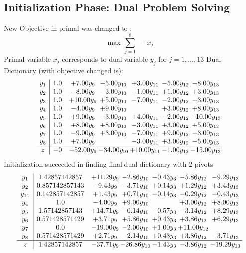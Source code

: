 \documentclass[9pt]{article}
\begin{document}
\subsection{Initialization Phase: Dual Problem Solving}
New Objective in primal was changed to : \[ \max\ \sum_{j=1}^{8}\ - x_j \] 
Primal variable $x_j$ corresponds to dual variable $y_j$ for $j = 1,\ldots,13$
Dual Dictionary (with objective changed is): 
\[\begin{array}{c| c c@{\hskip 2pt} c@{\hskip 2pt} c@{\hskip 2pt} c@{\hskip 2pt} c@{\hskip 2pt} }
 y_{1}   &  1.0 & +  7.00 y_{9} & -5.00 y_{10} & +  3.00 y_{11} & -5.00 y_{12} & -8.00 y_{13}\\
 y_{2}   &  1.0 & -8.00 y_{9} & -3.00 y_{10} & -1.00 y_{11} & +  1.00 y_{12} & +  3.00 y_{13}\\
 y_{3}   &  1.0 & + 10.00 y_{9} & +  5.00 y_{10} & -7.00 y_{11} & -2.00 y_{12} & -3.00 y_{13}\\
 y_{4}   &  1.0 & -4.00 y_{9} & +  9.00 y_{10} &   & +  3.00 y_{12} & +  8.00 y_{13}\\
 y_{5}   &  1.0 & +  9.00 y_{9} & -3.00 y_{10} & +  4.00 y_{11} & -2.00 y_{12} & + 10.00 y_{13}\\
 y_{6}   &  1.0 & +  8.00 y_{9} & +  8.00 y_{10} & -3.00 y_{11} & +  3.00 y_{12} & +  5.00 y_{13}\\
 y_{7}   &  1.0 & -9.00 y_{9} & +  3.00 y_{10} & -7.00 y_{11} & +  9.00 y_{12} & -3.00 y_{13}\\
 y_{8}   &  1.0 & +  7.00 y_{9} &   & -3.00 y_{11} & +  3.00 y_{12} & -5.00 y_{13}\\
\hline
z    &  -0 & -52.00 y_{9} & -34.00 y_{10} & + 10.00 y_{11} & -1.00 y_{12} & -15.00 y_{13}\\
\end{array}\]
Initialization succeeded in finding final dual dictionary with 2 pivots
\[\begin{array}{c| c c@{\hskip 2pt} c@{\hskip 2pt} c@{\hskip 2pt} c@{\hskip 2pt} c@{\hskip 2pt} }
 y_{1}   &  1.42857142857 & + 11.29 y_{9} & -2.86 y_{10} & -0.43 y_{3} & -5.86 y_{12} & -9.29 y_{13}\\
 y_{2}   &  0.857142857143 & -9.43 y_{9} & -3.71 y_{10} & +  0.14 y_{3} & +  1.29 y_{12} & +  3.43 y_{13}\\
 y_{11}   &  0.142857142857 & +  1.43 y_{9} & +  0.71 y_{10} & -0.14 y_{3} & -0.29 y_{12} & -0.43 y_{13}\\
 y_{4}   &  1.0 & -4.00 y_{9} & +  9.00 y_{10} &   & +  3.00 y_{12} & +  8.00 y_{13}\\
 y_{5}   &  1.57142857143 & + 14.71 y_{9} & -0.14 y_{10} & -0.57 y_{3} & -3.14 y_{12} & +  8.29 y_{13}\\
 y_{6}   &  0.571428571429 & +  3.71 y_{9} & +  5.86 y_{10} & +  0.43 y_{3} & +  3.86 y_{12} & +  6.29 y_{13}\\
 y_{7}   &  0.0 & -19.00 y_{9} & -2.00 y_{10} & +  1.00 y_{3} & + 11.00 y_{12} &   \\
 y_{8}   &  0.571428571429 & +  2.71 y_{9} & -2.14 y_{10} & +  0.43 y_{3} & +  3.86 y_{12} & -3.71 y_{13}\\
\hline
z    &  1.42857142857 & -37.71 y_{9} & -26.86 y_{10} & -1.43 y_{3} & -3.86 y_{12} & -19.29 y_{13}\\
\end{array}\]
\end{document}
